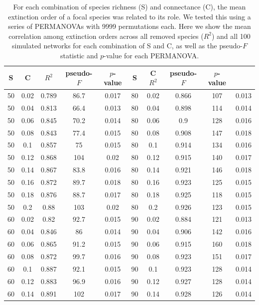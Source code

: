 \documentclass[12pt]{article}
\begin{document}
	\begin{table}[h!]
		\caption{For each combination of species richness (S) and connectance (C), the mean extinction order of a focal species was related to its role. We tested this using a series of PERMANOVAs with 9999 permutations each. Here we show the mean correlation among extinction orders across all removed species ($R^2$) and all 100 simulated networks for each combination of S and C, as well as the pseudo-$F$ statistic and $p$-value for each PERMANOVA.}
		\label{permtable}
		\begin{tabular}{c c | c | c c ||c c | c | c c |}
			S	&	C	&	$R^2$	&	pseudo-$F$	&	$p$-value	&	S	&	C	$R^2$	&	pseudo-$F$	&	$p$-value\\ 
			\hline
			50	&	0.02	&	0.789	&	86.7	&	0.017	&	80	&	0.02	&	0.866	&	107	&	0.013	\\
			50	&	0.04	&	0.813	&	66.4	&	0.013	&	80	&	0.04	&	0.898	&	114	&	0.014	\\
			50	&	0.06	&	0.845	&	70.2	&	0.014	&	80	&	0.06	&	0.9	&	128	&	0.016	\\
			50	&	0.08	&	0.843	&	77.4	&	0.015	&	80	&	0.08	&	0.908	&	147	&	0.018	\\
			50	&	0.1	&	0.857	&	75	&	0.015	&	80	&	0.1	&	0.914	&	134	&	0.016	\\
			50	&	0.12	&	0.868	&	104	&	0.02	&	80	&	0.12	&	0.915	&	140	&	0.017	\\
			50	&	0.14	&	0.867	&	83.8	&	0.016	&	80	&	0.14	&	0.921	&	146	&	0.018	\\
			50	&	0.16	&	0.872	&	89.7	&	0.018	&	80	&	0.16	&	0.923	&	125	&	0.015	\\
			50	&	0.18	&	0.876	&	88.7	&	0.017	&	80	&	0.18	&	0.925	&	118	&	0.015	\\
			50	&	0.2	&	0.88	&	103	&	0.02	&	80	&	0.2	&	0.926	&	123	&	0.015	\\
			60	&	0.02	&	0.82	&	92.7	&	0.015	&	90	&	0.02	&	0.884	&	121	&	0.013	\\
			60	&	0.04	&	0.846	&	86	&	0.014	&	90	&	0.04	&	0.906	&	142	&	0.016	\\
			60	&	0.06	&	0.865	&	91.2	&	0.015	&	90	&	0.06	&	0.915	&	160	&	0.018	\\
			60	&	0.08	&	0.872	&	99.7	&	0.016	&	90	&	0.08	&	0.923	&	151	&	0.017	\\
			60	&	0.1	&	0.887	&	92.1	&	0.015	&	90	&	0.1	&	0.923	&	128	&	0.014	\\
			60	&	0.12	&	0.883	&	96.9	&	0.016	&	90	&	0.12	&	0.927	&	128	&	0.014	\\
			60	&	0.14	&	0.891	&	102	&	0.017	&	90	&	0.14	&	0.928	&	126	&	0.014	\\

\end{tabular}
\end{table}
\end{document}
